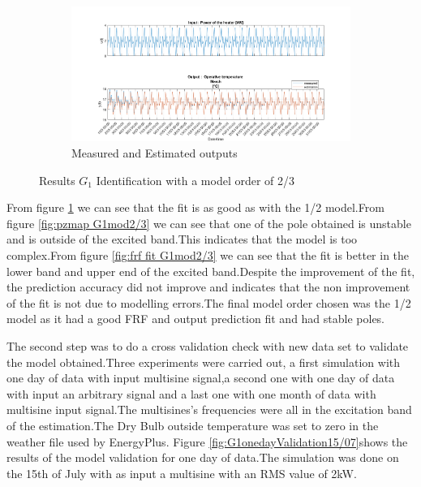 \documentclass[a4paper,12pt]{article}
\numberwithin{equation}{section}
\begin{document}
\begin{figure}[H]
\begin{subfigure}{\textwidth}
  \centering
  \includegraphics[scale=0.38]{G1mod23InOut.png}
  \caption{Measured and Estimated outputs}
  \label{fig:inoutG12/3}
\end{subfigure}
\caption{Results $G_{1}$ Identification with a model order of 2/3 }
\label{fig:G1mod2/3}
\end{figure}

\noindent
From figure \ref{fig:inoutG12/3} we can see that the fit is as good as with the 1/2 model.From figure \ref{fig:pzmap G1mod2/3} we can see that one of the pole obtained is unstable and is outside of the excited band.This indicates that the model is too complex.From figure \ref{fig:frf fit G1mod2/3} we can see that the fit is better in the lower band and upper end of the excited band.Despite the improvement of the fit, the prediction accuracy did not improve and indicates that the non improvement of the fit is not due to modelling errors.The final model order chosen was the 1/2 model as it had a good FRF and output prediction fit and had stable poles.

The second step was to do a cross validation check with new data set to validate the model obtained.Three  experiments were carried out, a first simulation with one day of data with input multisine signal,a second one with one day of data with input an arbitrary signal and a last one with one month of data with multisine input signal.The multisines's frequencies were all in the excitation band of the estimation.The Dry Bulb outside temperature was set to zero in the weather file used by EnergyPlus. Figure \ref{fig:G1onedayValidation15/07}shows the results of the model validation for one day of data.The simulation was done on the 15th of July with as input a multisine with an RMS value of 2kW.
\end{document}
